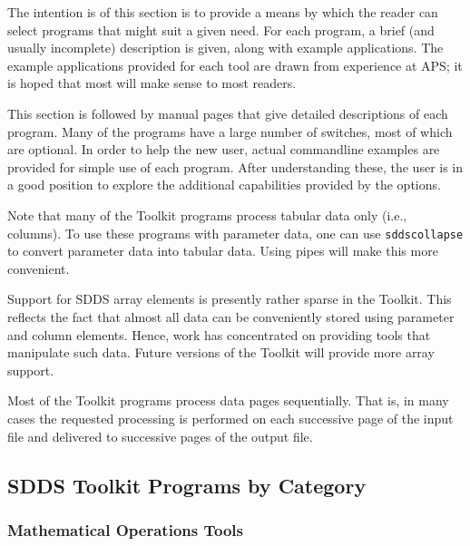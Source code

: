 \documentclass[11pt]{article}
\begin{document}
The intention is of this section is to provide a means by which the
reader can select programs that might suit a given need.  For each
program, a brief (and usually incomplete) description is given, along
with example applications.  The example applications provided for each
tool are drawn from experience at APS; it is hoped that most will make
sense to most readers.

This section is followed by manual pages that give detailed
descriptions of each program.  Many of the programs have a large
number of switches, most of which are optional.  In order to help the
new user, actual commandline examples are provided for simple use of
each program.  After understanding these, the user is in a good
position to explore the additional capabilities provided by the
options.

Note that many of the Toolkit programs process tabular data only
(i.e., columns).  To use these programs with parameter data, one can
use {\tt sddscollapse} to convert parameter data into tabular data.
Using pipes will make this more convenient.

Support for SDDS array elements is presently rather sparse in the
Toolkit.  This reflects the fact that almost all data can be
conveniently stored using parameter and column elements.  Hence, work
has concentrated on providing tools that manipulate such data.  Future
versions of the Toolkit will provide more array support.

Most of the Toolkit programs process data pages sequentially.  That
is, in many cases the requested processing is performed on each
successive page of the input file and delivered to successive pages of
the output file.

\subsection{SDDS Toolkit Programs by Category}

\subsubsection{ Mathematical Operations Tools}
\end{document}
